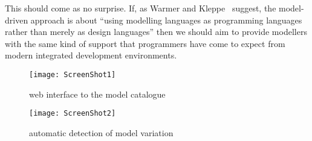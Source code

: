 This should come as no surprise.  If, as Warmer and
Kleppe~\cite{MDAWarmer} suggest, the model-driven approach is about
``using modelling languages as programming languages rather than
merely as design languages'' then we should aim to provide modellers
with the same kind of support that programmers have come to expect
from modern integrated development environments.

\clearpage

\begin{figure*}[h]
  \centering
  \texttt{[image: ScreenShot1]}
  \caption{web interface to the model catalogue}
  \label{fig:webinterface}
\end{figure*}

\begin{figure*}[h]
  \centering
  \texttt{[image: ScreenShot2]}  
  \caption{automatic detection of model variation}
  \label{fig:variation}
\end{figure*}

